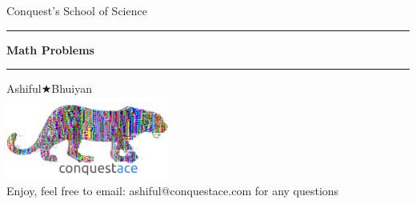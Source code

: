 \begin{titlepage}
    \begin{center}
        \vspace*{2cm}
        
        {\Large Conquest's School of Science} \\[1.5cm]
        
        \hrule
        \vspace{1cm}
        
        {\Huge \textbf{Math Problems}} \\[1cm]
        
        \hrule
        \vspace{1.5cm}
         \Large {Ashiful\(\bigstar\)Bhuiyan}\\ [1.5 cm]

 

        \includegraphics[width=0.4\textwidth]{logo.png} \\[1cm]


        \vfill
        {\large Enjoy, feel free to email: ashiful@conquestace.com for any questions} \\[1cm]
    \end{center}
\end{titlepage}